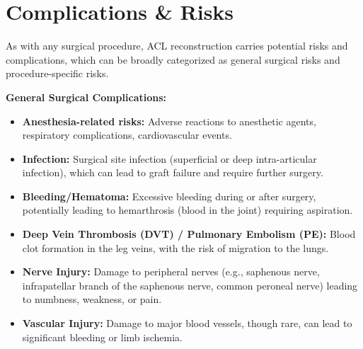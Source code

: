 \section*{Complications \& Risks}
As with any surgical procedure, ACL reconstruction carries potential risks and complications, which can be broadly categorized as general surgical risks and procedure-specific risks.

\textbf{General Surgical Complications:}
\begin{itemize}
  \item \textbf{Anesthesia-related risks:} Adverse reactions to anesthetic agents, respiratory complications, cardiovascular events.
  
  \item \textbf{Infection:} Surgical site infection (superficial or deep intra-articular infection), which can lead to graft failure and require further surgery.
  
  \item \textbf{Bleeding/Hematoma:} Excessive bleeding during or after surgery, potentially leading to hemarthrosis (blood in the joint) requiring aspiration.
  
  \item \textbf{Deep Vein Thrombosis (DVT) / Pulmonary Embolism (PE):} Blood clot formation in the leg veins, with the risk of migration to the lungs.
  
  \item \textbf{Nerve Injury:} Damage to peripheral nerves (e.g., saphenous nerve, infrapatellar branch of the saphenous nerve, common peroneal nerve) leading to numbness, weakness, or pain.
  
  \item \textbf{Vascular Injury:} Damage to major blood vessels, though rare, can lead to significant bleeding or limb ischemia.
\end{itemize}

